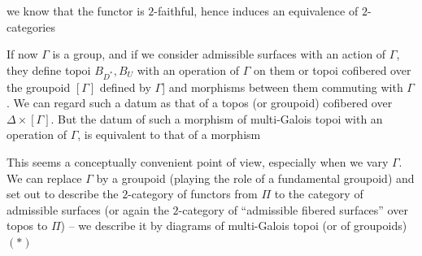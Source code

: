 we know that the functor is $2$-faithful, hence induces an equivalence of $2$-categories

If now $\Gamma$ is a group, and if we consider admissible surfaces with an action of $\Gamma$, they define topoi  $B_{D^*},B_U$ with an operation of $\Gamma$ on them \unsure{[|(}or topoi cofibered over the groupoid $[\Gamma]$ defined by $\Gamma$] and morphisms between them commuting with $\Gamma$. We can regard such a datum as that of a  topos (or groupoid) cofibered over $\Delta\times[\Gamma]$.   But the datum of such a morphism of multi-Galois topoi with an operation of $\Gamma$, is equivalent to that of a morphism 

This seems a conceptually convenient point of view, especially when we vary $\Gamma$. We can replace $\Gamma$ by a groupoid  \inserted{$\Pi$} (playing the role of a fundamental groupoid) and set out to describe the $2$-category  of functors from $\Pi$ to the category of admissible surfaces (or again the $2$-category of ``admissible fibered surfaces'' over   topos   to $\Pi$) -- we describe it by   diagrams of multi-Galois topoi (or of groupoids)
$(*)$

